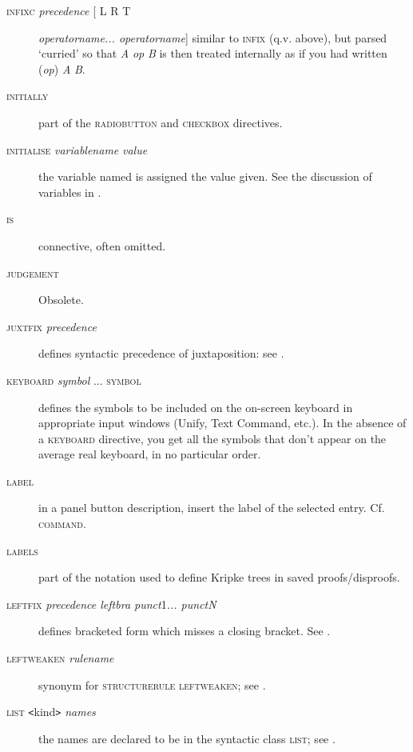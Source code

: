 \begin{description}
\item[\textsc{infixc} \textit{precedence} [ L {\textbar} R {\textbar} T ] \textit{operatorname... operatorname}] similar to \textsc{infix} (q.v. above), but parsed `curried' so that \textit{A} \textit{op} \textit{B} is then treated internally as if you had written (\textit{op}) \textit{A} \textit{B}.

\item[\textsc{initially}] part of the \textsc{radiobutton} and \textsc{checkbox} directives.

\item[\textsc{initialise} \textit{variablename} \textit{value}] the variable named is assigned the value given. See the discussion of variables in .

\item[\textsc{is}] connective, often omitted.

\item[\textsc{judgement}] Obsolete.

\item[\textsc{juxtfix} \textit{precedence}] defines syntactic precedence of juxtaposition: see .

\item[\textsc{keyboard} \textit{symbol} ... \textsc{symbol}] defines the symbols to be included on the on-screen keyboard in appropriate input windows (Unify, Text Command, etc.). In the absence of a \textsc{keyboard} directive, you get all the symbols that don't appear on the average real keyboard, in no particular order.

\item[\textsc{label}] in a panel button description, insert the label of the selected entry. Cf. \textsc{command}.

\item[\textsc{labels}] part of the notation used to define Kripke trees in saved proofs/disproofs.

\item[\textsc{leftfix} \textit{precedence leftbra punct}1\textit{... punctN}] defines bracketed form which misses a closing bracket. See .

\item[\textsc{leftweaken} \textit{rulename}] synonym for \textsc{structurerule} \textsc{leftweaken}; see .

\item[\textsc{list \texttt{<}}kind\textsc{\texttt{>}} \textit{names}] the names are declared to be in the syntactic class \textsc{list}; see .


\end{description}
